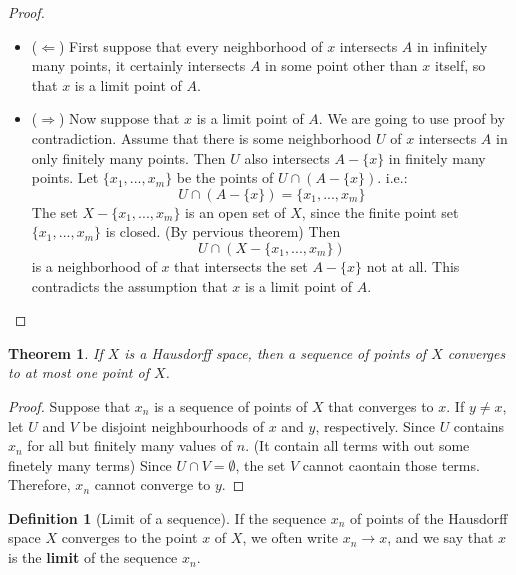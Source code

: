 \documentclass[
]{book}
\newtheorem{theorem}{Theorem}[chapter]
\theoremstyle{definition}
\newtheorem{definition}{Definition}[chapter]
\theoremstyle{definition}
\theoremstyle{definition}
\theoremstyle{definition}
\theoremstyle{remark}
\begin{document}
\begin{proof}
\leavevmode

\begin{itemize}
\item
  (\(\Longleftarrow\)) First suppose that every neighborhood of \(x\) intersects \(A\) in infinitely many points, it certainly intersects \(A\) in some point other than \(x\) itself, so that \(x\) is a limit point of \(A\).
\item
  (\(\Longrightarrow\)) Now suppose that \(x\) is a limit point of \(A\). We are going to use proof by contradiction. Assume that there is some neighborhood \(U\) of \(x\) intersects \(A\) in only finitely many points.
  Then \(U\) also intersects \(A - \{x\}\) in finitely many points. Let \(\{x_1,..., x_m\}\) be the points of \(U \cap (A - \{x\})\).
  i.e.: \[U \cap (A - \{x\})=\{x_1,..., x_m\}\]
  The set \(X - \{x_1,..., x_m\}\) is an open set of \(X\), since the finite point set \(\{x_1,..., x_m\}\) is closed. (By pervious theorem) Then \[U \cap (X - \{x_1,..., x_m\})\] is a neighborhood of \(x\) that intersects the set \(A - \{x\}\) not at all. This contradicts the assumption that \(x\) is a limit point of \(A\).
\end{itemize}

\end{proof}

\begin{theorem}
\protect\hypertarget{thm:unnamed-chunk-88}{}\label{thm:unnamed-chunk-88}If \(X\) is a Hausdorff space, then a sequence of points of \(X\) converges to at most one point of \(X\).
\end{theorem}

\begin{proof}
Suppose that \(x_n\) is a sequence of points of \(X\) that converges to \(x\). If \(y \neq x\), let \(U\) and \(V\) be disjoint neighbourhoods of \(x\) and \(y\), respectively. Since \(U\) contains \(x_n\) for all but finitely many values of \(n\). (It contain all terms with out some finetely many terms) Since \(U \cap V=\emptyset\), the set \(V\) cannot caontain those terms. Therefore, \(x_n\) cannot converge to \(y\).
\end{proof}

\begin{definition}[Limit of a sequence]
\protect\hypertarget{def:unnamed-chunk-90}{}\label{def:unnamed-chunk-90}If the sequence \(x_n\) of points of the Hausdorff space \(X\) converges to the point \(x\) of \(X\), we often write \(x_n \to x\), and we say that \(x\) is the \textbf{limit} of the sequence \(x_n\).
\end{definition}
\end{document}
